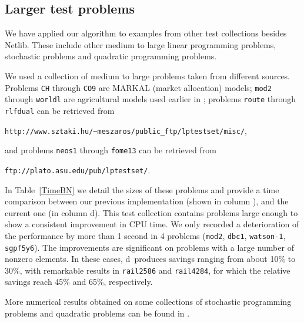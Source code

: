 %
%
\subsection{Larger test problems}
\label{BN-tests}

We have applied our algorithm to examples from other test collections 
besides Netlib.
These include other medium to large linear programming problems, 
stochastic problems and quadratic programming problems.

We used a collection of medium to large problems taken from different
sources. Problems {\tt CH} through {\tt CO9}
are MARKAL (market allocation) models; {\tt mod2} through {\tt worldl} are
agricultural models used earlier in \cite{Gondzio96}; problems {\tt route}
through {\tt rlfdual} can be retrieved from 
\begin{center}
{\tt http://www.sztaki.hu/\~{}meszaros/public\_ftp/lptestset/misc/},
\end{center}
and problems {\tt neos1} through {\tt fome13} can be retrieved from 
\begin{center}
{\tt ftp://plato.asu.edu/pub/lptestset/}.
\end{center}

In Table~\ref{TimeBN} we detail the sizes of these problems and provide 
a time comparison between our previous implementation (shown in column
\HO), and the current one (in column d\HO).
This test collection contains problems large enough 
to show a consistent improvement in CPU time. 
We only recorded a deterioration of the performance by more than 1 second
in 4 problems ({\tt mod2}, {\tt dbc1}, {\tt watson-1}, {\tt sgpf5y6}).
The improvements are significant on problems with a large 
number of nonzero elements. In these cases, d\HO\
produces savings ranging from about 10\% to 30\%, with remarkable results
in {\tt rail2586} and {\tt rail4284}, for which the relative savings 
reach 45\% and 65\%, respectively.

More numerical results obtained on some collections of stochastic
programming problems and quadratic problems can be found in
\cite{ColomboGondzio05}.

